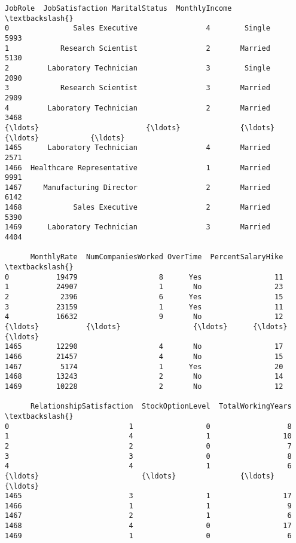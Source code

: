 \documentclass[11pt]{article}
\begin{document}
\begin{tcolorbox}[breakable, size=fbox, boxrule=.5pt, pad at break*=1mm, opacityfill=0]
\begin{Verbatim}[commandchars=\\\{\}]
                        JobRole  JobSatisfaction MaritalStatus  MonthlyIncome  \textbackslash{}
0               Sales Executive                4        Single           5993
1            Research Scientist                2       Married           5130
2         Laboratory Technician                3        Single           2090
3            Research Scientist                3       Married           2909
4         Laboratory Technician                2       Married           3468
{\ldots}                         {\ldots}              {\ldots}           {\ldots}            {\ldots}
1465      Laboratory Technician                4       Married           2571
1466  Healthcare Representative                1       Married           9991
1467     Manufacturing Director                2       Married           6142
1468            Sales Executive                2       Married           5390
1469      Laboratory Technician                3       Married           4404

      MonthlyRate  NumCompaniesWorked OverTime  PercentSalaryHike  \textbackslash{}
0           19479                   8      Yes                 11
1           24907                   1       No                 23
2            2396                   6      Yes                 15
3           23159                   1      Yes                 11
4           16632                   9       No                 12
{\ldots}           {\ldots}                 {\ldots}      {\ldots}                {\ldots}
1465        12290                   4       No                 17
1466        21457                   4       No                 15
1467         5174                   1      Yes                 20
1468        13243                   2       No                 14
1469        10228                   2       No                 12

      RelationshipSatisfaction  StockOptionLevel  TotalWorkingYears  \textbackslash{}
0                            1                 0                  8
1                            4                 1                 10
2                            2                 0                  7
3                            3                 0                  8
4                            4                 1                  6
{\ldots}                        {\ldots}               {\ldots}                {\ldots}
1465                         3                 1                 17
1466                         1                 1                  9
1467                         2                 1                  6
1468                         4                 0                 17
1469                         1                 0                  6


\end{Verbatim}
\end{tcolorbox}
\end{document}
